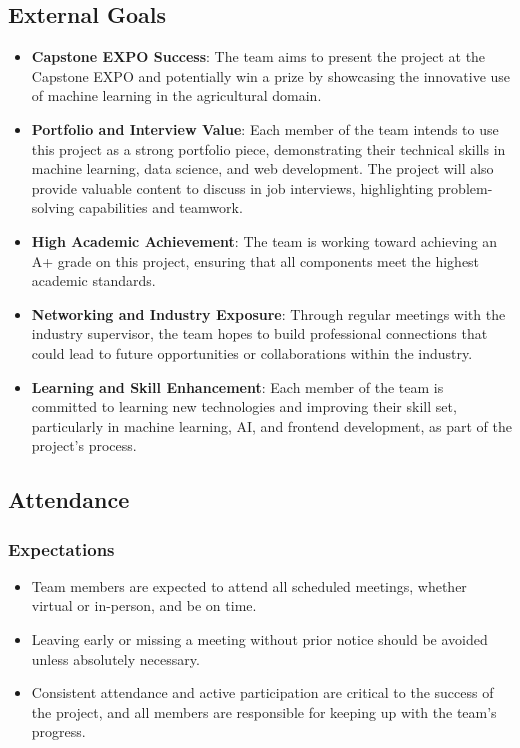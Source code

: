 \documentclass{article}
\begin{document}
\subsection*{External Goals}

\begin{itemize}
    \item \textbf{Capstone EXPO Success}: The team aims to present the project at the Capstone EXPO and potentially win a prize by showcasing the innovative use of machine learning in the agricultural domain.
    
    \item \textbf{Portfolio and Interview Value}: Each member of the team intends to use this project as a strong portfolio piece, demonstrating their technical skills in machine learning, data science, and web development. The project will also provide valuable content to discuss in job interviews, highlighting problem-solving capabilities and teamwork.
    
    \item \textbf{High Academic Achievement}: The team is working toward achieving an A+ grade on this project, ensuring that all components meet the highest academic standards.
    
    \item \textbf{Networking and Industry Exposure}: Through regular meetings with the industry supervisor, the team hopes to build professional connections that could lead to future opportunities or collaborations within the industry.
    
    \item \textbf{Learning and Skill Enhancement}: Each member of the team is committed to learning new technologies and improving their skill set, particularly in machine learning, AI, and frontend development, as part of the project's process.
\end{itemize}


\subsection*{Attendance}

\subsubsection*{Expectations}

\begin{itemize}
    \item Team members are expected to attend all scheduled meetings, whether virtual or in-person, and be on time.
    \item Leaving early or missing a meeting without prior notice should be avoided unless absolutely necessary.
    \item Consistent attendance and active participation are critical to the success of the project, and all members are responsible for keeping up with the team's progress.
\end{itemize}
\end{document}
